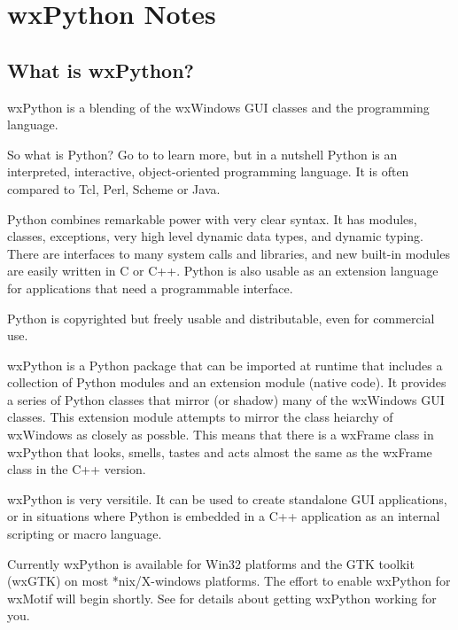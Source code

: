 \chapter{wxPython Notes}\label{wxPython}
%
%
\setfooter{\thepage}{}{}{}{}{\thepage}%

\section{What is wxPython?}\label{wxpwhat}

wxPython is a blending of the wxWindows GUI classes and the
 programming language.


So what is Python?  Go to
to learn more, but in a nutshell Python is an interpreted,
interactive, object-oriented programming language. It is often
compared to Tcl, Perl, Scheme or Java.

Python combines remarkable power with very clear syntax. It has
modules, classes, exceptions, very high level dynamic data types, and
dynamic typing. There are interfaces to many system calls and
libraries, and new built-in modules are easily written in C or
C++. Python is also usable as an extension language for applications
that need a programmable interface.

Python is copyrighted but freely usable and distributable, even for
commercial use.


wxPython is a Python package that can be imported at runtime that
includes a collection of Python modules and an extension module
(native code).  It provides a series of Python classes that mirror (or
shadow) many of the wxWindows GUI classes.  This extension module
attempts to mirror the class heiarchy of wxWindows as closely as
possble. This means that there is a wxFrame class in wxPython that
looks, smells, tastes and acts almost the same as the wxFrame class in
the C++ version.

wxPython is very versitile.  It can be used to create standalone GUI
applications, or in situations where Python is embedded in a C++
application as an internal scripting or macro language.

Currently wxPython is available for Win32 platforms and the GTK
toolkit (wxGTK) on most *nix/X-windows platforms.  The effort to
enable wxPython for wxMotif will begin shortly.  See  for details about getting wxPython working for you.


